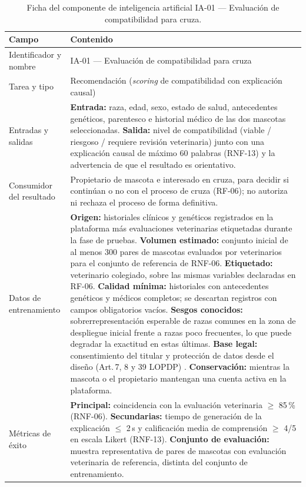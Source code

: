 \documentclass[journal,onecolumn]{IEEEtran}
\begin{document}
\begin{table}[H]
	\caption{Ficha del componente de inteligencia artificial IA-01 --- Evaluación de compatibilidad para cruza.}
	\label{tab:ficha_ia01}
	\small
	\begin{tabularx}{\textwidth}{|L{4.2cm}|X|}
		\hline
		\textbf{Campo} & \textbf{Contenido} \\
		\hline
		Identificador y nombre & IA-01 --- Evaluación de compatibilidad para cruza \\
		\hline
		Tarea y tipo & Recomendación (\textit{scoring} de compatibilidad con explicación causal) \\
		\hline
		Entradas y salidas & \textbf{Entrada:} raza, edad, sexo, estado de salud, antecedentes genéticos, parentesco e historial médico de las dos mascotas seleccionadas. \textbf{Salida:} nivel de compatibilidad (viable / riesgoso / requiere revisión veterinaria) junto con una explicación causal de máximo 60 palabras (RNF-13) y la advertencia de que el resultado es orientativo. \\
		\hline
		Consumidor del resultado & Propietario de mascota e interesado en cruza, para decidir si continúan o no con el proceso de cruza (RF-06); no autoriza ni rechaza el proceso de forma definitiva. \\
		\hline
		Datos de entrenamiento & \textbf{Origen:} historiales clínicos y genéticos registrados en la plataforma más evaluaciones veterinarias etiquetadas durante la fase de pruebas. \textbf{Volumen estimado:} conjunto inicial de al menos 300 pares de mascotas evaluados por veterinarios para el conjunto de referencia de RNF-06. \textbf{Etiquetado:} veterinario colegiado, sobre las mismas variables declaradas en RF-06. \textbf{Calidad mínima:} historiales con antecedentes genéticos y médicos completos; se descartan registros con campos obligatorios vacíos. \textbf{Sesgos conocidos:} sobrerrepresentación esperable de razas comunes en la zona de despliegue inicial frente a razas poco frecuentes, lo que puede degradar la exactitud en estas últimas. \textbf{Base legal:} consentimiento del titular y protección de datos desde el diseño (Art.\,7, 8 y 39 LOPDP) \cite{lopdp2021,lopdp_reglamento2023}. \textbf{Conservación:} mientras la mascota o el propietario mantengan una cuenta activa en la plataforma. \\
		\hline
		Métricas de éxito & \textbf{Principal:} coincidencia con la evaluación veterinaria $\geq$ 85\,\% (RNF-06). \textbf{Secundarias:} tiempo de generación de la explicación $\leq$ 2\,s y calificación media de comprensión $\geq$ 4/5 en escala Likert (RNF-13). \textbf{Conjunto de evaluación:} muestra representativa de pares de mascotas con evaluación veterinaria de referencia, distinta del conjunto de entrenamiento. \\

\end{tabularx}
\end{table}
\end{document}
